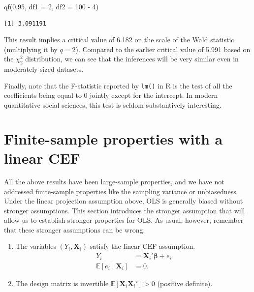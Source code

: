 \documentclass[
  13pt,
  letterpaper,
  DIV=11,
  numbers=noendperiod]{scrreprt}
\newenvironment{Shaded}{\begin{snugshade}}{\end{snugshade}}
\newcommand{\AttributeTok}[1]{\textcolor[rgb]{0.40,0.45,0.13}{#1}}
\newcommand{\DecValTok}[1]{\textcolor[rgb]{0.68,0.00,0.00}{#1}}
\newcommand{\FloatTok}[1]{\textcolor[rgb]{0.68,0.00,0.00}{#1}}
\newcommand{\FunctionTok}[1]{\textcolor[rgb]{0.28,0.35,0.67}{#1}}
\newcommand{\NormalTok}[1]{\textcolor[rgb]{0.00,0.23,0.31}{#1}}
\newcommand{\SpecialCharTok}[1]{\textcolor[rgb]{0.37,0.37,0.37}{#1}}
\newcommand{\mb}{\symbf}
\newcommand{\E}{\mathbb{E}}
\newcommand{\X}{\mb{X}}
\newcommand{\bfbeta}{\mb{\beta}}
\theoremstyle{plain}
\theoremstyle{definition}
\theoremstyle{definition}
\theoremstyle{remark}
\begin{document}
\begin{Shaded}
\begin{Highlighting}[]
\FunctionTok{qf}\NormalTok{(}\FloatTok{0.95}\NormalTok{, }\AttributeTok{df1 =} \DecValTok{2}\NormalTok{, }\AttributeTok{df2 =} \DecValTok{100} \SpecialCharTok{{-}} \DecValTok{4}\NormalTok{)}
\end{Highlighting}
\end{Shaded}

\begin{verbatim}
[1] 3.091191
\end{verbatim}

This result implies a critical value of 6.182 on the scale of the Wald
statistic (multiplying it by \(q = 2\)). Compared to the earlier
critical value of 5.991 based on the \(\chi^2_2\) distribution, we can
see that the inferences will be very similar even in moderately-sized
datasets.

Finally, note that the F-statistic reported by \texttt{lm()} in R is the
test of all the coefficients being equal to 0 jointly except for the
intercept. In modern quantitative social sciences, this test is seldom
substantively interesting.

\section{Finite-sample properties with a linear
CEF}\label{finite-sample-properties-with-a-linear-cef}

All the above results have been large-sample properties, and we have not
addressed finite-sample properties like the sampling variance or
unbiasedness. Under the linear projection assumption above, OLS is
generally biased without stronger assumptions. This section introduces
the stronger assumption that will allow us to establish stronger
properties for OLS. As usual, however, remember that these stronger
assumptions can be wrong.

\begin{tcolorbox}[enhanced jigsaw, title=\textcolor{quarto-callout-note-color}{\faInfo}\hspace{0.5em}{Assumption: Linear Regression Model}, breakable, colbacktitle=quarto-callout-note-color!10!white, toptitle=1mm, colback=white, arc=.35mm, left=2mm, opacityback=0, titlerule=0mm, colframe=quarto-callout-note-color-frame, leftrule=.75mm, coltitle=black, opacitybacktitle=0.6, bottomtitle=1mm, rightrule=.15mm, bottomrule=.15mm, toprule=.15mm]

\begin{enumerate}
\def\labelenumi{\arabic{enumi}.}
\item
  The variables \((Y_{i}, \X_{i})\) satisfy the linear CEF assumption.
  \[ 
  \begin{aligned}
    Y_{i} &= \X_{i}'\bfbeta + e_{i} \\
    \E[e_{i}\mid \X_{i}] & = 0.
  \end{aligned}
  \]
\item
  The design matrix is invertible \(\E[\X_{i}\X_{i}'] > 0\) (positive
  definite).
\end{enumerate}

\end{tcolorbox}
\end{document}
